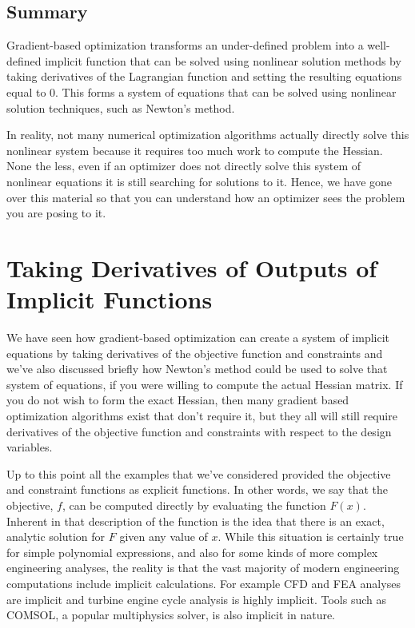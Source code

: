 \documentclass[conf]{new-aiaa}
\begin{document}
    \subsection{Summary}
    Gradient-based optimization transforms an under-defined problem into a well-defined implicit function that can be solved using nonlinear solution methods by taking derivatives of the Lagrangian function and setting the resulting equations equal to 0. 
    This forms a system of equations that can be solved using nonlinear solution techniques, such as Newton's method. 

    In reality, not many numerical optimization algorithms actually directly solve this nonlinear system because it requires too much work to compute the Hessian. 
    None the less, even if an optimizer does not directly solve this system of nonlinear equations it is still searching for solutions to it. 
    Hence, we have gone over this material so that you can understand how an optimizer sees the problem you are posing to it. 

    \section{Taking Derivatives of Outputs of Implicit Functions}

    We have seen how gradient-based optimization can create a system of implicit equations by taking derivatives of the objective function and constraints and we've also discussed briefly how Newton's method could be used to solve that system of equations, if you were willing to compute the actual Hessian matrix.
    If you do not wish to form the exact Hessian, then many gradient based optimization algorithms exist that don't require it, 
    but they all will still require derivatives of the objective function and constraints with respect to the design variables. 

    Up to this point all the examples that we've considered provided the objective and constraint functions as explicit functions. 
    In other words, we say that the objective, $f$, can be computed directly by evaluating the function $F(x)$. 
    Inherent in that description of the function is the idea that there is an exact, analytic solution for $F$ given any value of $x$. 
    While this situation is certainly true for simple polynomial expressions, and also for some kinds of more complex engineering analyses, 
    the reality is that the vast majority of modern engineering computations include implicit calculations. 
    For example CFD and FEA analyses are implicit and turbine engine cycle analysis is highly implicit. 
    Tools such as COMSOL, a popular multiphysics solver, is also implicit in nature. 
\end{document}
